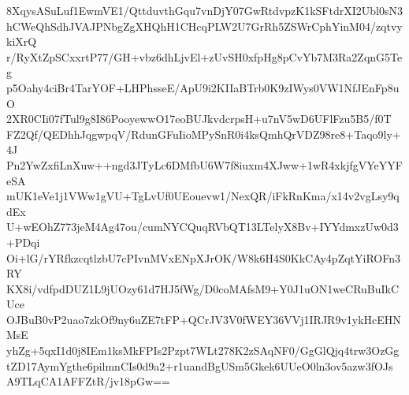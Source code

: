 8XqysASuLuf1EwmVE1/QttduvthGqu7vnDjY07GwRtdvpzK1kSFtdrXI2Ubl0sN3
hCWeQhSdhJVAJPNbgZgXHQhH1CHcqPLW2U7GrRh5ZSWrCphYinM04/zqtvykiXrQ
r/RyXtZpSCxxrtP77/GH+vbz6dhLjvEl+zUvSH0xfpHg8pCvYb7M3Ra2ZqnG5Teg
p5Oahy4ciBr4TarYOF+LHPhsseE/ApU9i2KIIaBTrb0K9zIWys0VW1NfJEnFp8uO
2XR0CIi07fTul9g8I86PooyewwO17eoBUJkvdcrpsH+u7nV5wD6UFlFzu5B5/f0T
FZ2Qf/QEDhhJqgwpqV/RdunGFuIioMPySnR0i4ksQmhQrVDZ98re8+Taqo9ly+4J
Pn2YwZxfiLnXuw++ngd3JTyLc6DMfbU6W7f8iuxm4XJww+1wR4xkjfgVYeYYFeSA
mUK1eVe1j1VWw1gVU+TgLvUf0UEouevw1/NexQR/iFkRnKma/x14v2vgLsy9qdEx
U+wEOhZ773jeM4Ag47ou/cumNYCQuqRVbQT13LTelyX8Bv+IYYdmxzUw0d3+PDqi
Oi+lG/rYRfkzcqtlzbU7cPIvnMVxENpXJrOK/W8k6H4S0KkCAy4pZqtYiROFn3RY
KX8i/vdfpdDUZ1L9jUOzy61d7HJ5fWg/D0coMAfsM9+Y0J1uON1weCRuBuIkCUce
OJBuB0vP2uao7zkOf9ny6uZE7tFP+QCrJV3V0fWEY36VVj1IRJR9v1ykHcEHNMsE
yhZg+5qxI1d0j8IEm1ksMkFPIs2Pzpt7WLt278K2zSAqNF0/GgGlQjq4trw3OzGg
tZD17AymYgthe6pilmnCIs0d9a2+r1uandBgUSm5Gkek6UUeO0ln3ov5azw3fOJs
A9TLqCA1AFFZtR/jv18pGw==
